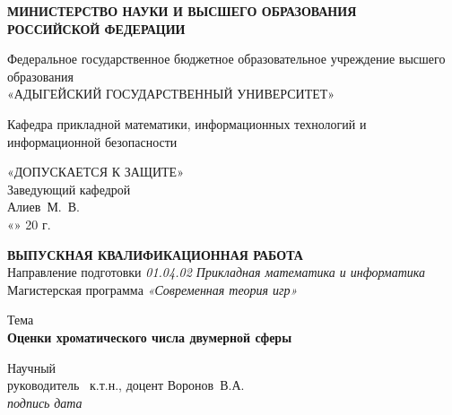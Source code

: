 \begin{titlepage} %
\begin{center} %

\textbf{ МИНИСТЕРСТВО НАУКИ И ВЫСШЕГО ОБРАЗОВАНИЯ \\
РОССИЙСКОЙ ФЕДЕРАЦИИ } %
\vspace{0.5cm} %

Федеральное государственное бюджетное образовательное учреждение высшего образования \\
\vspace{0.5cm} %
«АДЫГЕЙСКИЙ ГОСУДАРСТВЕННЫЙ УНИВЕРСИТЕТ»

\vspace{0.4cm} %
Кафедра прикладной математики, информационных технологий и \\ информационной безопасности %
\end{center}

\begin{flushright} %
«ДОПУСКАЕТСЯ К ЗАЩИТЕ» \\
Заведующий кафедрой \\
\underline{\hspace{2.5cm}} Алиев~М.~В. \\
«\underline{\hspace{0.7cm}}»\underline{\hspace{2,5cm}} 20 \underline{\hspace{0.7cm}}г.
\end{flushright}

\begin{center} %
\textbf{ ВЫПУСКНАЯ КВАЛИФИКАЦИОННАЯ РАБОТА } %
\vspace{0.3cm} \\
Направление подготовки \textit{01.04.02 Прикладная математика и информатика} \\
Магистерская программа \textit{«Современная теория игр»}

\vspace{0.5cm}
Тема\\
\textbf{Оценки хроматического числа двумерной сферы}
\end{center}

\begin{flushleft} %
Научный \\
руководитель \hspace{0.2cm} \underline{\hspace{2cm}} ~к.т.н., доцент Воронов~В.А. \hfill \underline{\hspace{2cm}} \\
\small %
\hspace{3.5cm} \textit{подпись}
\hspace{8.8cm} \textit{дата} \\


\end{flushleft}
\end{titlepage}
